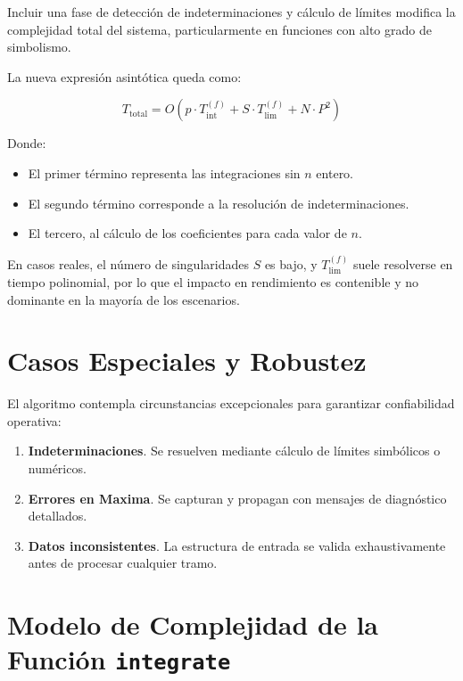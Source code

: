 Incluir una fase de detección de indeterminaciones y cálculo de límites
modifica la complejidad total del sistema, particularmente en funciones con
alto grado de simbolismo.

La nueva expresión asintótica queda como:

\[
T_{\text{total}} =
O\left(p \cdot T_{\text{int}}^{(f)} + S \cdot T_{\text{lim}}^{(f)} + N \cdot P^2\right)
\]

Donde:
\begin{itemize}
	\item El primer término representa las integraciones sin $n$ entero.
	\item El segundo término corresponde a la resolución de indeterminaciones.
	\item El tercero, al cálculo de los coeficientes para cada valor de $n$.
\end{itemize}

En casos reales, el número de singularidades $S$ es bajo, y $T_{\text{lim}}^{(f)}$
suele resolverse en tiempo polinomial, por lo que el impacto en rendimiento es
contenible y no dominante en la mayoría de los escenarios.


\section{Casos Especiales y Robustez}

El algoritmo contempla circunstancias excepcionales para garantizar
confiabilidad operativa:

\begin{enumerate}
	\item \textbf{Indeterminaciones}.  
	Se resuelven mediante cálculo de límites simbólicos o numéricos.
	\item \textbf{Errores en Maxima}.  
	Se capturan y propagan con mensajes de diagnóstico detallados.
	\item \textbf{Datos inconsistentes}.  
	La estructura de entrada se valida exhaustivamente antes de
	procesar cualquier tramo.
\end{enumerate}

\section{Modelo de Complejidad de la Función \texttt{integrate}}

